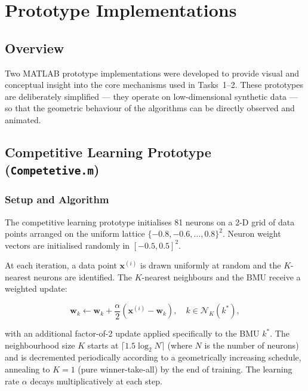\documentclass[12pt,a4paper]{report}
\begin{document}
\chapter{Prototype Implementations}
\label{ch:prototypes}

\section{Overview}

Two MATLAB prototype implementations were developed to provide visual and conceptual
insight into the core mechanisms used in Tasks~1–2. These prototypes are deliberately
simplified — they operate on low-dimensional synthetic data — so that the geometric
behaviour of the algorithms can be directly observed and animated.

\section{Competitive Learning Prototype (\texttt{Competetive.m})}

\subsection{Setup and Algorithm}

The competitive learning prototype initialises 81 neurons on a 2-D grid of data points
arranged on the uniform lattice $\{-0.8, -0.6, \ldots, 0.8\}^2$. Neuron weight vectors
are initialised randomly in $[-0.5, 0.5]^2$.

At each iteration, a data point $\mathbf{x}^{(i)}$ is drawn uniformly at random and the
$K$-nearest neurons are identified. The $K$-nearest neighbours and the BMU receive a
weighted update:

\begin{equation}
  \mathbf{w}_k \leftarrow \mathbf{w}_k + \frac{\alpha}{2}(\mathbf{x}^{(i)} - \mathbf{w}_k),
  \quad k \in \mathcal{N}_K(k^*),
\end{equation}

with an additional factor-of-2 update applied specifically to the BMU $k^*$. The
neighbourhood size $K$ starts at $\lceil 1.5\log_2 N \rceil$ (where $N$ is the number of
neurons) and is decremented periodically according to a geometrically increasing schedule,
annealing to $K=1$ (pure winner-take-all) by the end of training. The learning rate
$\alpha$ decays multiplicatively at each step.
\end{document}
